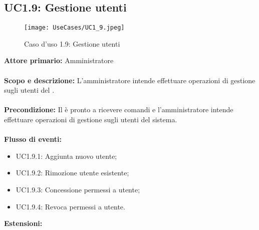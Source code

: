 \documentclass{scalatekids-article}
\begin{document}
\subsection{UC1.9: Gestione utenti}
\begin{figure}[H]
  \begin{center}
    \texttt{[image: UseCases/UC1\_9.jpeg]}
    \caption{Caso d'uso 1.9: Gestione utenti}
  \end{center}
\end{figure}
\textbf{Attore primario:} Amministratore\\ \\
\textbf{Scopo e descrizione:} L'amministratore intende effettuare operazioni di gestione sugli utenti del .\\ \\
\textbf{Precondizione:} Il  è pronto a ricevere comandi e l'amministratore intende effettuare operazioni di gestione sugli utenti del sistema.\\ \\
\textbf{Flusso di eventi:}
\begin{itemize}
\item UC1.9.1: Aggiunta nuovo utente;
\item UC1.9.2: Rimozione utente esistente;
\item UC1.9.3: Concessione permessi a utente;
\item UC1.9.4: Revoca permessi a utente.
\end{itemize}
\textbf{Estensioni:}
\end{document}
